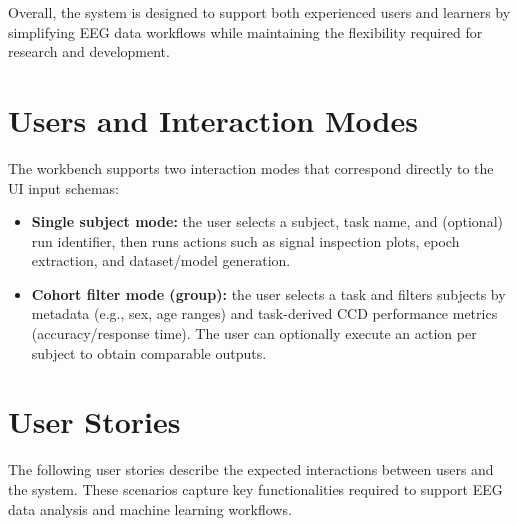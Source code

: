 Overall, the system is designed to support both experienced users and learners by simplifying EEG data workflows while maintaining the flexibility required for research and development.

\section{Users and Interaction Modes}
\label{sec:users-interaction-modes}

The workbench supports two interaction modes that correspond directly to the UI input schemas:
\begin{itemize}[leftmargin=*]
    \item \textbf{Single subject mode:} the user selects a subject, task name, and (optional) run identifier, then runs actions such as signal inspection plots, epoch extraction, and dataset/model generation.
    \item \textbf{Cohort filter mode (group):} the user selects a task and filters subjects by metadata (e.g., sex, age ranges) and task-derived CCD performance metrics (accuracy/response time). The user can optionally execute an action per subject to obtain comparable outputs.
\end{itemize}

\section{User Stories}
\label{sec:user-stories}

The following user stories describe the expected interactions between users and the system. These scenarios capture key functionalities required to support EEG data analysis and machine learning workflows.

